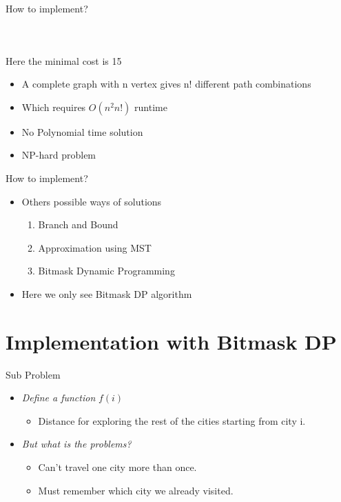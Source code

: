 \documentclass{beamer}
\begin{document}
\begin{frame}{How to implement?}
\begin{columns}
\begin{figure}[h]
    \end{figure}
    \end{columns}
    \begin{center}
        Here the minimal cost is 15 
    \end{center}
    \begin{itemize}
        \item A complete graph with n vertex gives n! different path combinations
        \item Which requires $O(n^2n!)$ runtime
        \item No Polynomial time solution
        \item NP-hard problem
    \end{itemize}
   
\end{frame}

\begin{frame}{How to implement?}
\begin{itemize}
    \item<1-> Others possible ways of solutions\\
        \begin{enumerate}
            \item<2-> Branch and Bound
            \item<3-> Approximation using MST
            \item<4-> Bitmask Dynamic Programming
        \end{enumerate}
    \item<5-> \alert{Here we only see Bitmask DP algorithm}
\end{itemize}
\end{frame}




\section{Implementation with Bitmask DP}
\begin{frame}{Sub Problem}
\begin{itemize}
    \item<1-> \textit{ Define a function }$f(i)$\\
    \begin{itemize}
        \item <2-> Distance for exploring the rest of the cities starting from city i.
    \end{itemize}
    \item<3-> \textit{But what is the problems? }\\
    \begin{itemize}
        \item <4-> Can't travel one city more than once.
        \item <5->Must remember which city we already visited.
    \end{itemize}
\end{itemize}
\end{frame}
\end{document}
